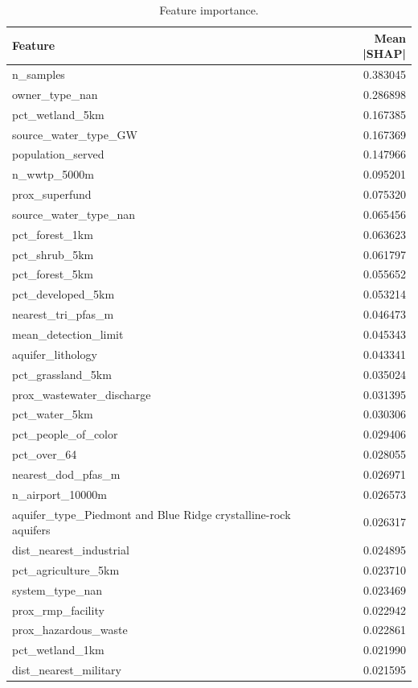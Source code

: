 \begin{table}
\caption{Feature importance.}
\label{tab:features}
\begin{tabular}{lr}
\toprule
Feature & Mean |SHAP| \\
\midrule
n_samples & 0.383045 \\
owner_type_nan & 0.286898 \\
pct_wetland_5km & 0.167385 \\
source_water_type_GW & 0.167369 \\
population_served & 0.147966 \\
n_wwtp_5000m & 0.095201 \\
prox_superfund & 0.075320 \\
source_water_type_nan & 0.065456 \\
pct_forest_1km & 0.063623 \\
pct_shrub_5km & 0.061797 \\
pct_forest_5km & 0.055652 \\
pct_developed_5km & 0.053214 \\
nearest_tri_pfas_m & 0.046473 \\
mean_detection_limit & 0.045343 \\
aquifer_lithology & 0.043341 \\
pct_grassland_5km & 0.035024 \\
prox_wastewater_discharge & 0.031395 \\
pct_water_5km & 0.030306 \\
pct_people_of_color & 0.029406 \\
pct_over_64 & 0.028055 \\
nearest_dod_pfas_m & 0.026971 \\
n_airport_10000m & 0.026573 \\
aquifer_type_Piedmont and Blue Ridge crystalline-rock aquifers & 0.026317 \\
dist_nearest_industrial & 0.024895 \\
pct_agriculture_5km & 0.023710 \\
system_type_nan & 0.023469 \\
prox_rmp_facility & 0.022942 \\
prox_hazardous_waste & 0.022861 \\
pct_wetland_1km & 0.021990 \\
dist_nearest_military & 0.021595 \\
\bottomrule
\end{tabular}
\end{table}
